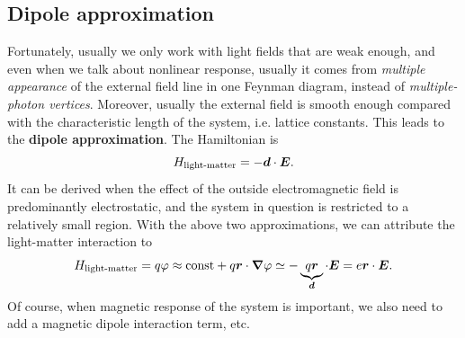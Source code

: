\documentclass[hyperref, a4paper]{report}
\newcommand*{\const}{\mathrm{const}}
\newcommand*{\concept}[1]{{\textbf{#1}}}
\begin{document}
\subsection{Dipole approximation}

Fortunately, usually we only work with light fields 
that are weak enough,
and even when we talk about nonlinear response,
usually it comes from \emph{multiple appearance} of the external field line in one Feynman diagram,
instead of \emph{multiple-photon vertices}.
Moreover, usually the external field is smooth enough 
compared with the characteristic length of the system, i.e. lattice constants.
This leads to the \concept{dipole approximation}.
The Hamiltonian is 
\begin{equation}
    H_{\text{light-matter}} = - \vb*{d} \cdot \vb*{E}.
\end{equation}
It can be derived when the effect of the outside electromagnetic field is predominantly electrostatic,
and the system in question is restricted to a relatively small region.
With the above two approximations,
we can attribute the light-matter interaction to 
\begin{equation}
    H_{\text{light-matter}} = q \varphi \approx \const + q \vb*{r} \cdot \grad{\varphi}
    \simeq - \underbrace{q \vb*{r}}_{\vb*{d}} \cdot \vb*{E}
    = e \vb*{r} \cdot \vb*{E}.
    \label{eq:light-matter.dipole-1}
\end{equation}
Of course, when magnetic response of the system is important, 
we also need to add a magnetic dipole interaction term, etc. 
\end{document}
